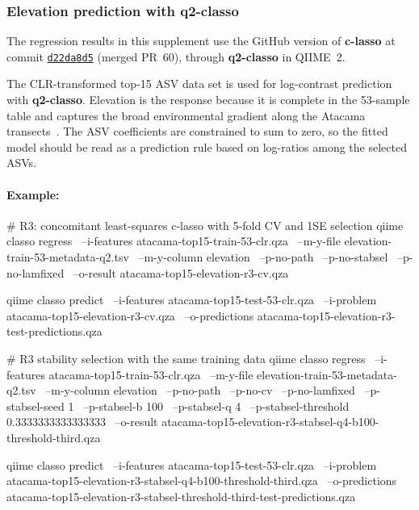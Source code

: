 \documentclass[11pt,a4paper]{article}
\newcommand{\pkg}[1]{\textbf{#1}}
\begin{document}
\subsubsection{Elevation prediction with q2-classo}
\label{sec:lowdim-regression}

The regression results in this supplement use the GitHub version of
\pkg{c-lasso} at commit
\href{https://github.com/bio-datascience/c-lasso/commit/d22da8d5ea54eb499de2fce82fa6c0e1f0c2dcc0}{\texttt{d22da8d5}}
(merged PR~60), through \pkg{q2-classo} in QIIME~2.

The CLR-transformed top-15 ASV data set is used for log-contrast prediction with
\pkg{q2-classo}. Elevation is the response because it is complete in
the 53-sample table and captures the broad environmental gradient along the
Atacama transects~\citep{knief2020tracing}. The ASV coefficients are constrained to sum to zero, so the
fitted model should be read as a prediction rule based on log-ratios among the
selected ASVs.

\paragraph{Example:} \mbox{}
\begin{PseudoCode}
# R3: concomitant least-squares c-lasso with 5-fold CV and 1SE selection
qiime classo regress \
    --i-features atacama-top15-train-53-clr.qza \
    --m-y-file elevation-train-53-metadata-q2.tsv \
    --m-y-column elevation \
    --p-no-path \
    --p-no-stabsel \
    --p-no-lamfixed \
    --o-result atacama-top15-elevation-r3-cv.qza

qiime classo predict \
    --i-features atacama-top15-test-53-clr.qza \
    --i-problem atacama-top15-elevation-r3-cv.qza \
    --o-predictions atacama-top15-elevation-r3-test-predictions.qza

# R3 stability selection with the same training data
qiime classo regress \
    --i-features atacama-top15-train-53-clr.qza \
    --m-y-file elevation-train-53-metadata-q2.tsv \
    --m-y-column elevation \
    --p-no-path \
    --p-no-cv \
    --p-no-lamfixed \
    --p-stabsel-seed 1 \
    --p-stabsel-b 100 \
    --p-stabsel-q 4 \
    --p-stabsel-threshold 0.3333333333333333 \
    --o-result atacama-top15-elevation-r3-stabsel-q4-b100-threshold-third.qza

qiime classo predict \
    --i-features atacama-top15-test-53-clr.qza \
    --i-problem atacama-top15-elevation-r3-stabsel-q4-b100-threshold-third.qza \
    --o-predictions atacama-top15-elevation-r3-stabsel-threshold-third-test-predictions.qza
\end{PseudoCode}
\end{document}
